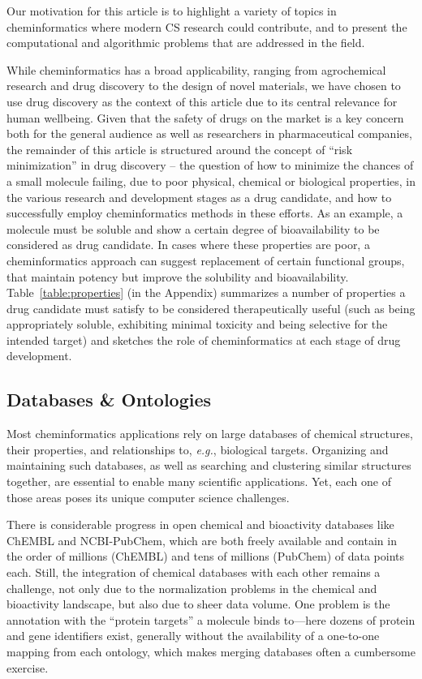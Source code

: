 \documentclass{sig-alternate}
\begin{document}
Our motivation for this article is to highlight a variety of topics in
cheminformatics where modern CS research could contribute, and
to present the computational and algorithmic problems
that are addressed in the field.

While cheminformatics has a broad applicability, ranging from
agrochemical research and drug discovery to the design of novel
materials, we have chosen to use drug discovery as the context of this
article due to its central relevance for human wellbeing. Given that
the safety of drugs on the market is a key concern both for the
general audience as well as researchers in pharmaceutical companies,
the remainder of this article is structured around the concept of
``risk minimization'' in drug discovery -- the question of how to
minimize the chances of a small molecule failing, due to poor
physical, chemical or biological properties, in the various research
and development stages as a drug candidate, and how to successfully
employ cheminformatics methods in these efforts. As an example, a
molecule must be soluble and show a certain degree of bioavailability
to be considered as drug candidate. In cases where these properties
are poor, a cheminformatics approach can suggest replacement of
certain functional groups, that maintain potency but improve the
solubility and bioavailability.  Table~\ref{table:properties} (in the
Appendix) summarizes a number of properties a drug candidate must
satisfy to be considered therapeutically useful (such as being
appropriately soluble, exhibiting minimal toxicity and being selective
for the intended target) and sketches the role of cheminformatics at
each stage of drug development.
%
\subsection{Databases \& Ontologies}
\label{sec:databases}
%
Most cheminformatics applications rely on large databases of chemical structures,
their properties, and relationships to, \textit{e.g.}, biological targets.
Organizing and maintaining such databases, as well as searching and clustering similar structures together,
are essential  to enable many scientific applications. Yet, each one of
those areas poses its unique computer science challenges.

There is considerable progress in open chemical and bioactivity databases like
ChEMBL and NCBI-PubChem, which are both freely available and contain in the order of millions (ChEMBL) and tens of
millions (PubChem) of data points each. Still, the integration
of chemical databases with each other remains a challenge, not only due to the
normalization problems in the chemical and bioactivity landscape, but also due
to sheer data volume. One problem is the annotation with the ``protein targets'' a molecule binds to---here dozens of
protein and gene identifiers exist, generally without the availability of a one-to-one mapping from each ontology, which makes merging databases often a cumbersome exercise.
\end{document}
